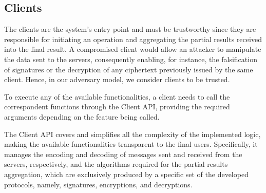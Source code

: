 \subsection{Clients} \label{subsec:clients}
The clients are the system's entry point and must be trustworthy since they are responsible for initiating an operation and aggregating the partial results received into the final result. A compromised client would allow an attacker to manipulate the data sent to the servers, consequently enabling, for instance, the falsification of signatures or the decryption of any ciphertext previously issued by the same client. Hence, in our adversary model, we consider clients to be trusted.

To execute any of the available functionalities, a client needs to call the correspondent functions through the Client API, providing the required arguments depending on the feature being called.

The Client API covers and simplifies all the complexity of the implemented logic, making the available functionalities transparent to the final users. Specifically, it manages the encoding and decoding of messages sent and received from the servers, respectively, and the algorithms required for the partial results aggregation, which are exclusively produced by a specific set of the developed protocols, namely, signatures, encryptions, and decryptions.

